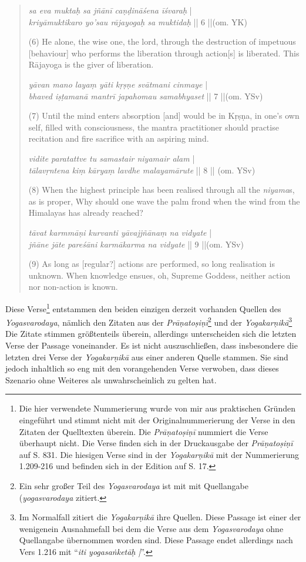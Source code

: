 \begin{quote}
\textit{sa eva muktaḥ sa jñānī caṇḍināśena īśvaraḥ} |\\
\textit{kriyāmuktikaro yo'sau rājayogaḥ sa muktidaḥ} || 6 ||(om. YK)

(6) He alone, the wise one, the lord, through the destruction of impetuous [behaviour]
who performs the liberation through action[s] is liberated. This Rājayoga is the giver of liberation.

\textit{yāvan mano layaṃ yāti kṛṣṇe svātmani cinmaye} | \\
\textit{bhaved iṣṭamanā mantrī japahomau samabhyaset} || 7 ||(om. YSv)

(7) Until the mind enters absorption [and] would be in Kṛṣṇa, in one's own self, filled with consciousness,
the mantra practitioner should practise recitation and fire sacrifice with an aspiring mind. 

\textit{vidite paratattve tu samastair niyamair alam} |\\
\textit{tālavṛntena kiṃ kāryaṃ lavdhe malayamārute} || 8 || (om. YSv)

(8) When the highest principle has been realised through all the \textit {niyama}s, as is proper,
Why should one wave the palm frond when the wind from the Himalayas has already reached?

\textit{tāvat karmmāṇi kurvanti yāvajjñānaṃ na vidyate} |\\
\textit{jñāne jāte pareśāni karmākarma na vidyate} || 9 ||(om. YSv)

(9) As long as [regular?] actions are performed, so long realisation is unknown.
When knowledge ensues, oh, Supreme Goddess, neither action nor non-action is known.
\end{quote}

Diese Verse\footnote{Die hier verwendete Nummerierung wurde von mir aus praktischen Gründen eingeführt und stimmt nicht mit der Originalnummerierung der Verse in den Zitaten der Quelltexten überein. Die \textit{Prāṇatoṣiṇī} nummiert die Verse überhaupt nicht. Die Verse finden sich in der Druckausgabe der \textit{Prāṇatoṣiṇī} auf S. 831. Die hiesigen Verse sind in der \textit{Yogakarṇikā} mit der Nummerierung 1.209-216 und befinden sich in der Edition auf S. 17.} entstammen den beiden einzigen derzeit vorhanden Quellen des \textit{Yogasvarodaya}, nämlich den Zitaten aus der \textit{Prāṇatoṣiṇī}\footnote{Ein sehr großer Teil des \textit{Yogasvarodaya} ist mit mit Quellangabe (\textit{yogasvarodaya} zitiert.} und der \textit{Yogakarṇikā}\footnote{Im Normalfall zitiert die \textit{Yogakarṇikā} ihre Quellen. Diese Passage ist einer der wenigenein Ausnahmefall bei dem die Verse aus dem \textit{Yogasvarodaya} ohne Quellangabe übernommen worden sind. Diese Passage endet allerdings nach Vers 1.216 mit ``\textit{iti yogasaṅketāḥ |}''.} Die Zitate stimmen größtenteils überein, allerdings unterscheiden sich die letzten Verse der Passage voneinander. Es ist nicht auszuschließen, dass insbesondere die letzten drei Verse der \textit{Yogakarṇikā} aus einer anderen Quelle stammen. Sie sind jedoch inhaltlich so eng mit den vorangehenden Verse verwoben, dass dieses Szenario ohne Weiteres als unwahrscheinlich zu gelten hat.

